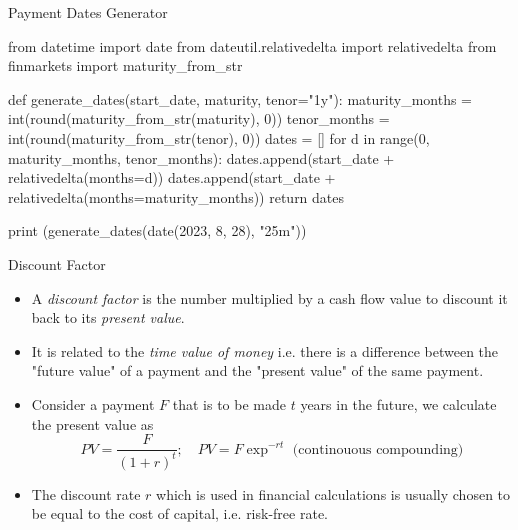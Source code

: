 \documentclass{beamer}
\begin{document}
\begin{frame}[fragile]{Payment Dates Generator}
  \begin{ipython}
from datetime import date
from dateutil.relativedelta import relativedelta
from finmarkets import maturity_from_str
			
def generate_dates(start_date, maturity, tenor="1y"):
    maturity_months = int(round(maturity_from_str(maturity), 0))
    tenor_months = int(round(maturity_from_str(tenor), 0))
    dates = []
    for d in range(0, maturity_months, tenor_months):
        dates.append(start_date + relativedelta(months=d))
    dates.append(start_date + relativedelta(months=maturity_months))
    return dates
			
print (generate_dates(date(2023, 8, 28), "25m"))
\end{ipython}
\begin{ioutput}
\end{ioutput}
\end{frame}

\begin{frame}{Discount Factor}
  \begin{itemize}
  \item A \emph{discount factor} is the number multiplied by a cash flow value to discount it back to its \emph{present value}.
  \item It is related to the \emph{time value of money} i.e. there is a difference between the "future value" of a payment and the "present value" of the same payment.
  \item Consider a payment $F$ that is to be made $t$ years in the future, we calculate the present value as
    \begin{equation}
      PV = \frac{F}{(1+r)^t};\quad PV=F\exp^{-rt}\textrm{ (continouous compounding)}
    \end{equation}
  \item The discount rate $r$ which is used in financial calculations is usually chosen to be equal to the cost of capital, i.e. risk-free rate.
  \end{itemize}
\end{frame}
\end{document}
